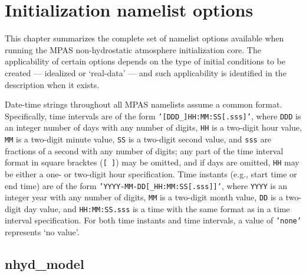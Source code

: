 
\chapter{Initialization namelist options}

This chapter summarizes the complete set of namelist options available when running the MPAS non-hydrostatic atmosphere initialization core.
The applicability of certain options depends on the type of initial conditions to be created --- idealized or `real-data' --- and such applicability 
is identified in the description when it exists.

Date-time strings throughout all MPAS namelists assume a common format. Specifically, time intervals are of the form {\tt '[DDD\_]HH:MM:SS[.sss]'},
where {\tt DDD} is an integer number of days with any number of digits, {\tt HH} is a two-digit hour value, {\tt MM} is a two-digit minute value, {\tt SS} is a two-digit second value, and {\tt sss} are fractions of a second with any number of digits;
any part of the time interval format in square bracktes ({\tt [ ]}) may be omitted, and if days are omitted, {\tt HH} may be either a one- or two-digit hour specification.
Time instants (e.g., start time or end time) are of the form {\tt 'YYYY-MM-DD[\_HH:MM:SS[.sss]]'}, where {\tt YYYY} is an integer year with any number of digits, {\tt MM}
is a two-digit month value, {\tt DD} is a two-digit day value, and {\tt HH:MM:SS.sss} is a time with the same format as in a time interval specification. For both time instants and time intervals, a value of {\tt 'none'} represents `no value'.

\section{nhyd\_model}

